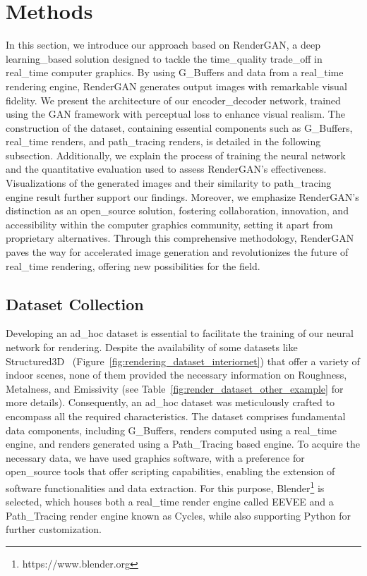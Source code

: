 \section{Methods}
\label{sec:methods}
In this section, we introduce our approach based on RenderGAN, a deep learning_based solution designed to tackle the time_quality trade_off in real_time computer graphics. By using G_Buffers and data from a real_time rendering engine, RenderGAN generates output images with remarkable visual fidelity. We present the architecture of our encoder_decoder network, trained using the GAN framework with perceptual loss to enhance visual realism. The construction of the dataset, containing essential components such as G_Buffers, real_time renders, and path_tracing renders, is detailed in the following subsection. Additionally, we explain the process of training the neural network and the quantitative evaluation used to assess RenderGAN's effectiveness. Visualizations of the generated images and their similarity to path_tracing engine result further support our findings. Moreover, we emphasize RenderGAN's distinction as an open_source solution, fostering collaboration, innovation, and accessibility within the computer graphics community, setting it apart from proprietary alternatives. Through this comprehensive methodology, RenderGAN paves the way for accelerated image generation and revolutionizes the future of real_time rendering, offering new possibilities for the field.

\subsection{Dataset Collection}
\label{subsec:dataset}
Developing an ad_hoc dataset is essential to facilitate the training of our neural network for rendering. Despite the availability of some datasets like Structured3D~\cite{zheng2020structured3d} (Figure~\ref{fig:rendering_dataset_interiornet}) that offer a variety of indoor scenes, none of them provided the necessary information on Roughness, Metalness, and Emissivity (see Table~\ref{fig:render_dataset_other_example} for more details). Consequently, an ad_hoc dataset was meticulously crafted to encompass all the required characteristics. The dataset comprises fundamental data components, including G_Buffers, renders computed using a real_time engine, and renders generated using a Path_Tracing based engine. To acquire the necessary data, we have used graphics software, with a preference for open_source tools that offer scripting capabilities, enabling the extension of software functionalities and data extraction. For this purpose, Blender\footnote{https://www.blender.org} is selected, which houses both a real_time render engine called EEVEE and a Path_Tracing render engine known as Cycles, while also supporting Python for further customization. 

